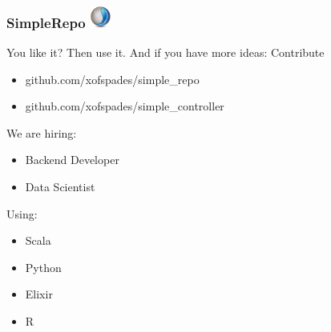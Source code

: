 \documentclass{beamer}
\begin{document}

\begin{frame}[fragile]
\frametitle{SimpleRepo \hfill \includegraphics[width=0.05\textwidth]{recogizer_logo_small.png}}
\centerline{You like it? Then use it. And if you have more ideas: Contribute}
\begin{itemize}
\item github.com/xofspades/simple\_repo
\pause
\item github.com/xofspades/simple\_controller
\end{itemize}
\end{frame}


\begin{frame}
\vspace{30 px}
We are hiring:
\begin{itemize}
\item Backend Developer
\item Data Scientist
\end{itemize}
Using:
\begin{itemize}
\item Scala
\item Python
\item Elixir
\item R
\end{itemize}

\end{frame}

\end{document}
